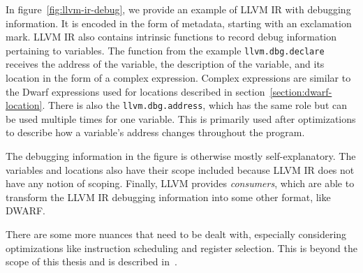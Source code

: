 In figure~\ref{fig:llvm-ir-debug}, we provide an example of LLVM IR with
debugging information. It is encoded in the form of metadata, starting with an
exclamation mark. LLVM IR also contains intrinsic functions to record debug
information pertaining to variables. The function from the example
\texttt{llvm.dbg.declare} receives the address of the variable, the description
of the variable, and its location in the form of a complex expression. Complex
expressions are similar to the Dwarf expressions used for locations described
in section~\ref{section:dwarf-location}. There is also the
\texttt{llvm.dbg.address}, which has the same role but can be used multiple
times for one variable. This is primarily used after optimizations to describe
how a variable's address changes throughout the program.

The debugging information in the figure is otherwise mostly self-explanatory.
The variables and locations also have their scope included because LLVM IR does
not have any notion of scoping. Finally, LLVM provides \textit{consumers},
which are able to transform the LLVM IR debugging information into some other
format, like DWARF.

There are some more nuances that need to be dealt with, especially considering
optimizations like instruction scheduling and register selection. This is
beyond the scope of this thesis and is described in~\cite{llvm-debug-info}.

